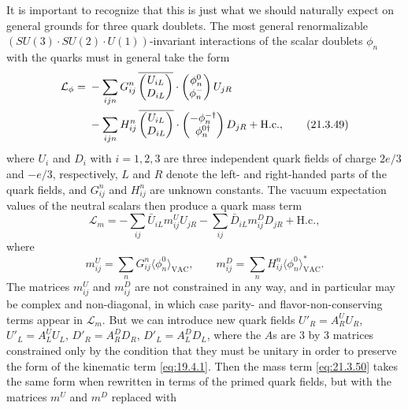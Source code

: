 It is important to recognize that this is just what we should naturally expect on general grounds for three quark doublets. The most general renormalizable $(SU(3)\cdot SU(2)\cdot U(1))$-invariant interactions of the scalar doublets $\phi_n$ with the quarks must in general take the form
\begin{align}
\mathcal{L}_\phi
={}&-\sum_{ijn}G_{ij}^n\,
\overline{\begin{pmatrix}U_{iL}\\D_{iL}\end{pmatrix}}
\cdot
\begin{pmatrix}\phi_n^0\\\phi_n^-\end{pmatrix}
U_{jR}
\notag\\
&-\sum_{ijn}H_{ij}^n\,
\overline{\begin{pmatrix}U_{iL}\\D_{iL}\end{pmatrix}}
\cdot
\begin{pmatrix}-\phi_n^{-\dagger}\\\phi_n^{0\dagger}\end{pmatrix}
D_{jR}
+\mathrm{H.c.},
\tag{21.3.49}\label{eq:21.3.49}
\end{align}
where $U_i$ and $D_i$ with $i=1,2,3$ are three independent quark fields of charge $2e/3$ and $-e/3$, respectively, $L$ and $R$ denote the left- and right-handed parts of the quark fields, and $G_{ij}^n$ and $H_{ij}^n$ are unknown constants. The vacuum expectation values of the neutral scalars then produce a quark mass term
\begin{equation}
\mathcal{L}_m
=-\sum_{ij}\bar U_{iL}m_{ij}^U U_{jR}
-\sum_{ij}\bar D_{iL}m_{ij}^D D_{jR}
+\mathrm{H.c.},
\tag{21.3.50}\label{eq:21.3.50}
\end{equation}
where
\begin{equation}
m_{ij}^U=\sum_nG_{ij}^n\langle\phi_n^0\rangle_{\mathrm{VAC}},
\qquad
m_{ij}^D=\sum_nH_{ij}^n\langle\phi_n^0\rangle_{\mathrm{VAC}}^*.
\tag{21.3.51}\label{eq:21.3.51}
\end{equation}
The matrices $m_{ij}^U$ and $m_{ij}^D$ are not constrained in any way, and in particular may be complex and non-diagonal, in which case parity- and flavor-non-conserving terms appear in $\mathcal{L}_m$. But we can introduce new quark fields $U'_R=A_R^U U_R$, $U'_L=A_L^U U_L$, $D'_R=A_R^D D_R$, $D'_L=A_L^D D_L$, where the $A$s are $3$ by $3$ matrices constrained only by the condition that they must be unitary in order to preserve the form of the kinematic term \eqref{eq:19.4.1}. Then the mass term \eqref{eq:21.3.50} takes the same form when rewritten in terms of the primed quark fields, but with the matrices $m^U$ and $m^D$ replaced with
